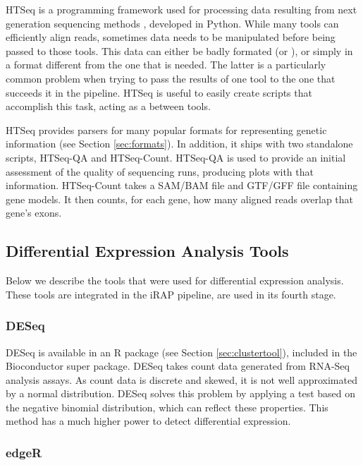 HTSeq is a programming framework used for processing data resulting from next
generation sequencing methods \cite{htseq}, developed in Python. While many
tools can efficiently align reads, sometimes data needs to be manipulated before
being passed to those tools. This data can either be badly formated (or
), or simply in a format different from the one that is needed. The
latter is a particularly common problem when trying to pass the results of one
tool to the one that succeeds it in the pipeline. HTSeq is useful to easily
create scripts that accomplish this task, acting as a  between tools.

HTSeq provides parsers for many popular formats for representing genetic
information (see Section \ref{sec:formats}). In addition, it ships with two
standalone scripts, HTSeq-QA and HTSeq-Count. HTSeq-QA is used to provide an
initial assessment of the quality of sequencing runs, producing plots with that
information. HTSeq-Count takes a SAM/BAM file and GTF/GFF file containing gene
models. It then counts, for each gene, how many aligned reads overlap that
gene's exons.

\subsection{Differential Expression Analysis Tools}\label{sec:difexptools}

Below we describe the tools that were used for differential expression analysis.
These tools are integrated in the iRAP pipeline, are used in its fourth stage.

\subsubsection*{DESeq}

DESeq \cite{20979621} is available in an R package (see Section
\ref{sec:clustertool}), included in the Bioconductor super package. DESeq takes
count data generated from RNA-Seq analysis assays. As count data is discrete and
skewed, it is not well approximated by a normal distribution. DESeq solves this
problem by applying a test based on the negative binomial distribution, which
can reflect these properties. This method has a much higher power to detect
differential expression.

\subsubsection*{edgeR}

